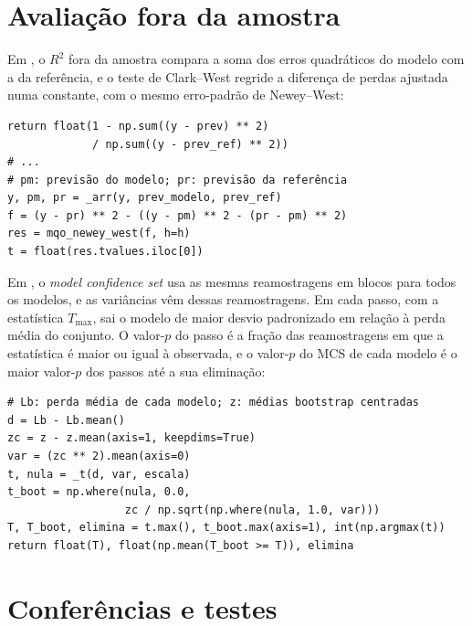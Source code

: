 \section{Avaliação fora da amostra}

Em , o $R^2$ fora da amostra compara a soma
dos erros quadráticos do modelo com a da referência, e o teste de Clark--West
regride a diferença de perdas ajustada numa constante, com o mesmo erro-padrão
de Newey--West:

\begin{verbatim}
return float(1 - np.sum((y - prev) ** 2)
             / np.sum((y - prev_ref) ** 2))
# ...
# pm: previsão do modelo; pr: previsão da referência
y, pm, pr = _arr(y, prev_modelo, prev_ref)
f = (y - pr) ** 2 - ((y - pm) ** 2 - (pr - pm) ** 2)
res = mqo_newey_west(f, h=h)
t = float(res.tvalues.iloc[0])
\end{verbatim}

Em , o \textit{model confidence set} usa as mesmas
reamostragens em blocos para todos os modelos, e as variâncias vêm dessas
reamostragens. Em cada passo, com a estatística $T_{\max}$, sai o modelo de
maior desvio padronizado em relação à perda média do conjunto. O valor-$p$ do
passo é a fração das reamostragens em que a estatística é maior ou igual à
observada, e o valor-$p$ do MCS de cada modelo é o maior valor-$p$ dos passos
até a sua eliminação:

\begin{verbatim}
# Lb: perda média de cada modelo; z: médias bootstrap centradas
d = Lb - Lb.mean()
zc = z - z.mean(axis=1, keepdims=True)
var = (zc ** 2).mean(axis=0)
t, nula = _t(d, var, escala)
t_boot = np.where(nula, 0.0,
                  zc / np.sqrt(np.where(nula, 1.0, var)))
T, T_boot, elimina = t.max(), t_boot.max(axis=1), int(np.argmax(t))
return float(T), float(np.mean(T_boot >= T)), elimina
\end{verbatim}

\section{Conferências e testes}

